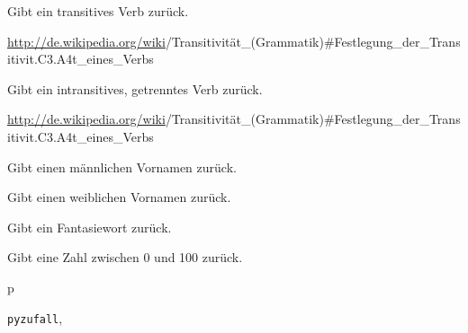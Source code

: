 \documentclass[a4paper,12pt,oneside]{sphinxmanual}
\begin{document}

\begin{fulllineitems}
\label{funktionen:pyzufall.verbt}
Gibt ein transitives Verb zurück.

\href{http://de.wikipedia.org/wiki}{http://de.wikipedia.org/wiki}/Transitivität\_(Grammatik)\#Festlegung\_der\_Transitivit.C3.A4t\_eines\_Verbs

\end{fulllineitems}


\begin{fulllineitems}
\label{funktionen:pyzufall.verbt2}
Gibt ein intransitives, getrenntes Verb zurück.

\href{http://de.wikipedia.org/wiki}{http://de.wikipedia.org/wiki}/Transitivität\_(Grammatik)\#Festlegung\_der\_Transitivit.C3.A4t\_eines\_Verbs

\end{fulllineitems}


\begin{fulllineitems}
\label{funktionen:pyzufall.vorname_m}
Gibt einen männlichen Vornamen zurück.

\end{fulllineitems}


\begin{fulllineitems}
\label{funktionen:pyzufall.vorname_w}
Gibt einen weiblichen Vornamen zurück.

\end{fulllineitems}


\begin{fulllineitems}
\label{funktionen:pyzufall.wort}
Gibt ein Fantasiewort zurück.

\end{fulllineitems}


\begin{fulllineitems}
\label{funktionen:pyzufall.zahl}
Gibt eine Zahl zwischen 0 und 100 zurück.

\end{fulllineitems}



\renewcommand{\indexname}{Python-Modulindex}
\begin{theindex}
\def\bigletter#1{{\Large\sffamily#1}\nopagebreak\vspace{1mm}}
\bigletter{p}
\item {\texttt{pyzufall}}, \pageref{funktionen:module-pyzufall}
\end{theindex}

\renewcommand{\indexname}{Stichwortverzeichnis}
\printindex
\end{document}
